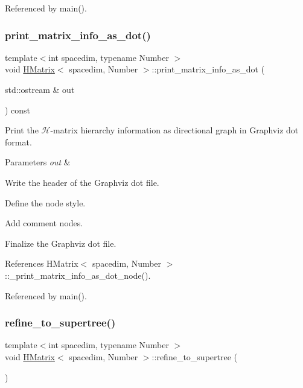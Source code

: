 Referenced by main().

\mbox{\label{classHMatrix_ae904288a7e0ac82d9fd2364b1c150bc2}} 
\subsubsection{\texorpdfstring{print\+\_\+matrix\+\_\+info\+\_\+as\+\_\+dot()}{print\_matrix\_info\_as\_dot()}}
{\footnotesize\ttfamily template$<$int spacedim, typename Number $>$ \\
void \hyperlink{classHMatrix}{H\+Matrix}$<$ spacedim, Number $>$\+::print\+\_\+matrix\+\_\+info\+\_\+as\+\_\+dot (\begin{DoxyParamCaption}\item[{std\+::ostream \&}]{out }\end{DoxyParamCaption}) const}

Print the $\mathcal{H}$-\/matrix hierarchy information as directional graph in Graphviz dot format.


\begin{DoxyParams}{Parameters}
{\em out} & \\
\hline
\end{DoxyParams}
Write the header of the Graphviz dot file.

Define the node style.

Add comment nodes.

Finalize the Graphviz dot file.

References H\+Matrix$<$ spacedim, Number $>$\+::\+\_\+print\+\_\+matrix\+\_\+info\+\_\+as\+\_\+dot\+\_\+node().



Referenced by main().

\mbox{\label{classHMatrix_ad2b353962226c78910d6ddb6b5b8e460}} 
\subsubsection{\texorpdfstring{refine\+\_\+to\+\_\+supertree()}{refine\_to\_supertree()}}
{\footnotesize\ttfamily template$<$int spacedim, typename Number $>$ \\
void \hyperlink{classHMatrix}{H\+Matrix}$<$ spacedim, Number $>$\+::refine\+\_\+to\+\_\+supertree (\begin{DoxyParamCaption}{ }\end{DoxyParamCaption})}

